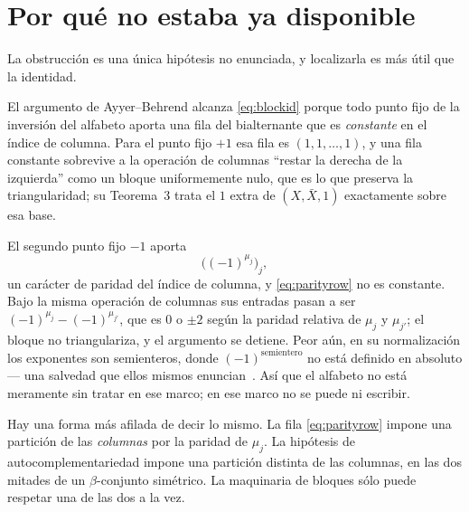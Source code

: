 \documentclass[11pt,a4paper]{article}
\begin{document}
\section{Por qu\'e no estaba ya disponible}\label{sec:why}

La obstrucci\'on es una \'unica hip\'otesis no enunciada, y localizarla es m\'as \'util que la
identidad.

El argumento de Ayyer--Behrend alcanza \eqref{eq:blockid} porque todo punto fijo de la
inversi\'on del alfabeto aporta una fila del bialternante que es \emph{constante} en el
\'indice de columna. Para el punto fijo $+1$ esa fila es $(1,1,\dots,1)$, y una fila constante
sobrevive a la operaci\'on de columnas ``restar la derecha de la izquierda'' como un bloque
uniformemente nulo, que es lo que preserva la triangularidad; su Teorema~3 trata el $1$ extra
de $(X,\bar X,1)$ exactamente sobre esa base.

El segundo punto fijo $-1$ aporta
\begin{equation}\label{eq:parityrow}
\big((-1)^{\mu_j}\big)_j,
\end{equation}
un car\'acter de paridad del \'indice de columna, y \eqref{eq:parityrow} no es constante. Bajo
la misma operaci\'on de columnas sus entradas pasan a ser $(-1)^{\mu_j}-(-1)^{\mu_{j'}}$, que
es $0$ o $\pm2$ seg\'un la paridad relativa de $\mu_j$ y $\mu_{j'}$; el bloque no
triangulariza, y el argumento se detiene. Peor a\'un, en su normalizaci\'on los exponentes son
semienteros, donde $(-1)^{\text{semientero}}$ no est\'a definido en absoluto --- una salvedad
que ellos mismos enuncian~\cite[p.~3]{AB}. As\'i que el alfabeto no est\'a meramente sin tratar
en ese marco; en ese marco no se puede ni escribir.

Hay una forma m\'as afilada de decir lo mismo. La fila \eqref{eq:parityrow} impone una
partici\'on de las \emph{columnas} por la paridad de $\mu_j$. La hip\'otesis de
autocomplementariedad impone una partici\'on distinta de las columnas, en las dos mitades de un
$\beta$-conjunto sim\'etrico. La maquinaria de bloques s\'olo puede respetar una de las dos a la vez.
\end{document}
